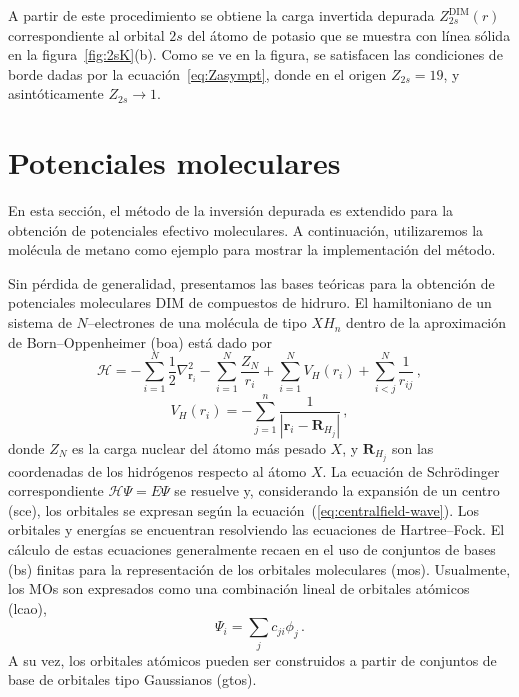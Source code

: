 A partir de este procedimiento se obtiene la carga invertida depurada 
$Z_{2s}^{\mathrm{DIM}}(r)$ correspondiente al orbital $2s$ del átomo 
de potasio que se muestra con línea sólida en la figura~\ref{fig:2sK}(b).
Como se ve en la figura, se satisfacen las condiciones de borde dadas por
la ecuación~\ref{eq:Zasympt}, donde en el origen $Z_{2s} = 19$, y 
asintóticamente $Z_{2s} \rightarrow 1$.

\section{Potenciales moleculares}
\label{sec:potmoleculares}

En esta sección, el método de la inversión depurada es extendido para 
la obtención de potenciales efectivo moleculares. A continuación, 
utilizaremos la molécula de metano como ejemplo para mostrar la 
implementación del método.

Sin pérdida de generalidad, presentamos las bases teóricas para la 
obtención de potenciales moleculares DIM de compuestos de hidruro.
El hamiltoniano de un sistema de $N$--electrones de una molécula de 
tipo $X\!H_n$ dentro de la aproximación de Born--Oppenheimer (\acs{boa})
está dado por
\begin{equation}
 \mathcal{H}=-\sum_{i=1}^N \frac{1}{2} \nabla^2_{\mathbf{r}_i} 
 - \sum_{i=1}^N \frac{Z_N}{r_i} 
 + \sum_{i=1}^N V_H(r_i)
 + \sum_{i<j}^N \frac{1}{r_{ij}}\,,
\end{equation}
\begin{equation}
 V_H(r_i)=-\sum_{j=1}^{n} \frac{1}{\left|\mathbf{r}_i-\mathbf{R}_{H_j}\right|}\,,
\end{equation}
donde $Z_N$ es la carga nuclear del átomo más pesado $X$, y $\mathbf{R}_{H_j}$ 
son las coordenadas de los hidrógenos respecto al átomo $X$. La ecuación
de Schr\"odinger correspondiente $\mathcal{H}\Psi=E\Psi$ se resuelve 
y, considerando la expansión de un centro (\acs{sce}), los orbitales se 
expresan según la ecuación~(\ref{eq:centralfield-wave}). Los orbitales
y energías se encuentran resolviendo las ecuaciones de Hartree--Fock. El
cálculo de estas ecuaciones generalmente recaen en el uso de conjuntos de 
bases (\acs{bs}) finitas para la representación de los orbitales 
moleculares (\acsp{mo}). Usualmente, los MOs son expresados como una
combinación lineal de orbitales atómicos (\acs{lcao}),
\begin{equation}
 \Psi_i=\sum_j c_{ji} \phi_j\,.
\end{equation}
A su vez, los orbitales atómicos pueden ser construidos a partir de 
conjuntos de base de orbitales tipo Gaussianos (\acsp{gto}).


